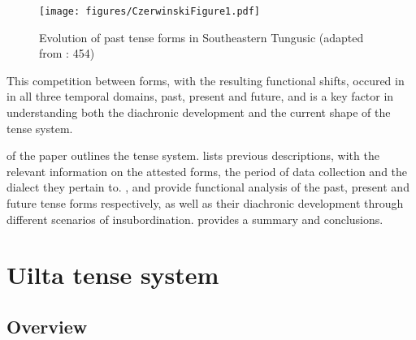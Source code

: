 \documentclass[output=paper,colorlinks,citecolor=brown]{langscibook}
\begin{document}

\begin{figure}
\texttt{[image: figures/CzerwinskiFigure1.pdf]}
\caption{Evolution of past tense forms in Southeastern Tungusic (adapted from \citealt{Malchukov_2000}: 454)}
\label{tab:evolution}
\end{figure}

This competition between forms, with the resulting functional shifts, occured in  in all three temporal domains, past, present and future, and is a key factor in understanding both the diachronic development and the current shape of the  tense system.

 of the paper outlines the  tense system.  lists previous descriptions, with the relevant information on the attested forms, the period of data collection and the dialect they pertain to. ,  and  provide functional analysis of the past, present and future tense forms respectively, as well as their diachronic development through different scenarios of insubordination.  provides a summary and conclusions.


\section{Uilta tense system}\label{Section3.2}

\subsection{Overview}
\end{document}

